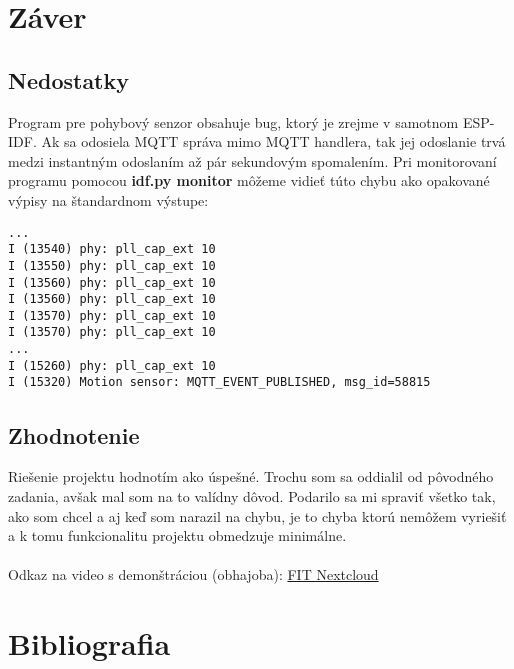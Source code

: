 \documentclass[a4paper,12pt]{article}
\begin{document}
\newpage
\section{Záver}

\subsection{Nedostatky}
Program pre pohybový senzor obsahuje bug, ktorý je zrejme v samotnom ESP-IDF. Ak sa odosiela MQTT správa mimo MQTT handlera, tak jej odoslanie trvá medzi instantným odoslaním až pár sekundovým spomalením.
Pri monitorovaní programu pomocou \textbf{idf.py monitor} môžeme vidieť túto chybu ako opakované výpisy na štandardnom výstupe:
\begin{lstlisting}
...
I (13540) phy: pll_cap_ext 10
I (13550) phy: pll_cap_ext 10
I (13560) phy: pll_cap_ext 10
I (13560) phy: pll_cap_ext 10
I (13570) phy: pll_cap_ext 10
I (13570) phy: pll_cap_ext 10
...
I (15260) phy: pll_cap_ext 10
I (15320) Motion sensor: MQTT_EVENT_PUBLISHED, msg_id=58815
\end{lstlisting}

\subsection{Zhodnotenie}
Riešenie projektu hodnotím ako úspešné. Trochu som sa oddialil od pôvodného zadania, avšak mal som na to valídny dôvod. Podarilo sa mi spraviť všetko tak, ako som chcel a aj keď som narazil na chybu, je to chyba ktorú nemôžem vyriešiť a k tomu funkcionalitu projektu obmedzuje minimálne.
\\
\\
Odkaz na video s demonštráciou (obhajoba): \href{https://nextcloud.fit.vutbr.cz/s/j4gPicrpMYzc3ek}{\color{blue}FIT Nextcloud}

\newpage
\section{Bibliografia}


\nocite{espidf}
\nocite{espidfgithub}
\nocite{espcam}
\nocite{rgbled}
\end{document}
